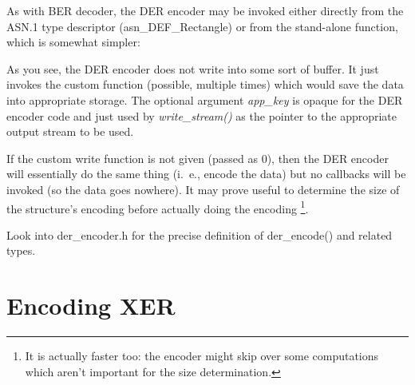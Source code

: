 \documentclass[english,oneside,12pt]{book}
\begin{document}
As with BER decoder, the DER encoder may be invoked either directly
from the ASN.1 type descriptor (asn\_DEF\_Rectangle) or from the stand-alone
function, which is somewhat simpler:
As you see, the DER encoder does not write into some sort of buffer.
It just invokes the custom function (possible, multiple
times) which would save the data into appropriate storage. The optional
argument \emph{app\_key} is opaque for the DER encoder code and just
used by \emph{write\_stream()} as the pointer to the appropriate
output stream to be used.

If the custom write function is not given (passed as 0), then the
DER encoder will essentially do the same thing (i.~e., encode the data)
but no callbacks will be invoked (so the data goes nowhere). It may
prove useful to determine the size of the structure's encoding before
actually doing the encoding%
\footnote{It is actually faster too: the encoder might skip over some computations
which aren't important for the size determination.%
}.

Look into der\_encoder.h for the precise definition of der\_encode()
and related types.


\section{\label{sec:Encoding-XER}Encoding XER}
\end{document}
